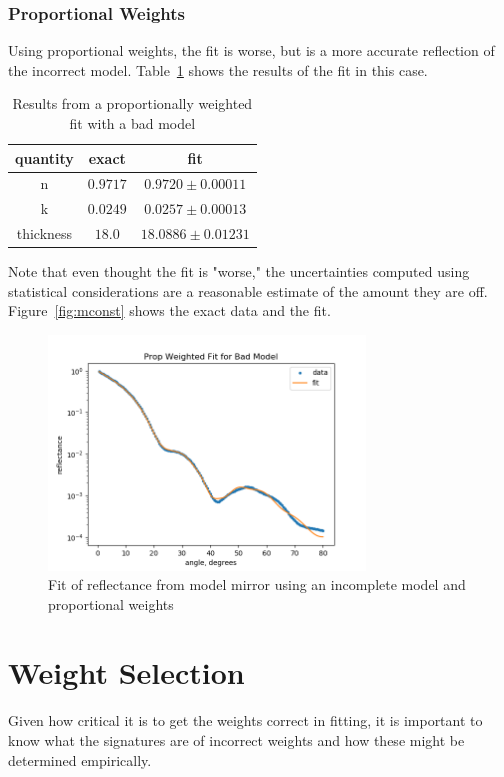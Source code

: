 \documentclass[english]{scrartcl}
\begin{document}
\subsubsection{Proportional Weights}
Using proportional weights, the fit is worse, but is a more
accurate reflection of the incorrect model.
Table~\ref{tab:mprop} shows the results of the fit
in this case.
\begin{table}[htb]
	\begin{center}
		\begin{tabular}{| c | c | c |}
			\hline
			quantity & exact & fit\\ \hline\hline
			n & $0.9717$ & $0.9720\pm 0.00011$\\
			k & $0.0249$ & $0.0257\pm 0.00013$\\
			thickness & $18.0$ & $18.0886\pm 0.01231$\\ \hline
		\end{tabular}
	\end{center}
	\caption{\label{tab:mprop}Results from a proportionally
		weighted fit with a bad model}
\end{table}
Note that even thought the fit is "worse," the uncertainties
computed using statistical considerations are a reasonable
estimate of the amount they are off.
Figure~\ref{fig:mconst} shows the exact data and the fit.
\begin{figure}[htb]
	\begin{center}
		\includegraphics[width=0.75\textwidth]{images/mprop}
	\end{center}
	\caption{\label{fig:mprop}Fit of reflectance from model mirror using an incomplete model and proportional weights}
\end{figure}

\section{Weight Selection}
Given how critical it is to get the weights correct in
fitting, it is important to know what the signatures are
of incorrect weights and how these might be determined
empirically.
\end{document}
